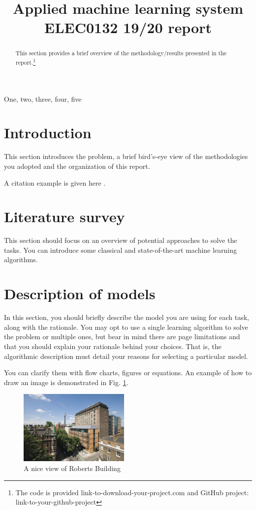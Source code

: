 \documentclass{article}
\title{Applied machine learning system ELEC0132 19/20 report}
\begin{document}
%
\maketitle
%
\begin{abstract}
    This section provides a brief overview of the methodology/results presented in the report.\footnote{The code is provided link-to-download-your-project.com and GitHub project: link-to-your-github-project}
\end{abstract}
%
\begin{keywords}
    One, two, three, four, five
\end{keywords}
%

\section{Introduction}
\label{sec:intro}
    This section introduces the problem, a brief bird's-eye view of the methodologies you adopted and the organization of this report.
    
    A citation example is given here \cite{C2}.


\section{Literature survey}
\label{sec:lite}
    This section should focus on an overview of potential approaches to solve the tasks. You can introduce some classical and state-of-the-art machine learning algorithms.


\section{Description of models}
\label{sec:models}
    In this section, you should briefly describe the model you are using for each task, along with the rationale. You may opt to use a single learning algorithm to solve the problem or multiple ones, but bear in mind there are page limitations and that you should explain your rationale behind your choices. That is, the algorithmic description must detail your reasons for selecting a particular model.
    
    You can clarify them with flow charts, figures or equations. An example of how to draw an image is demonstrated in Fig. \ref{fig:roberts_building}.
    
    \begin{figure}[htb]
    \centering
    \includegraphics[width=0.48\textwidth]{images/Roberts_building.jpg}
    \caption{A nice view of Roberts Building}
    \label{fig:roberts_building}
    \end{figure}
    
\end{document}
